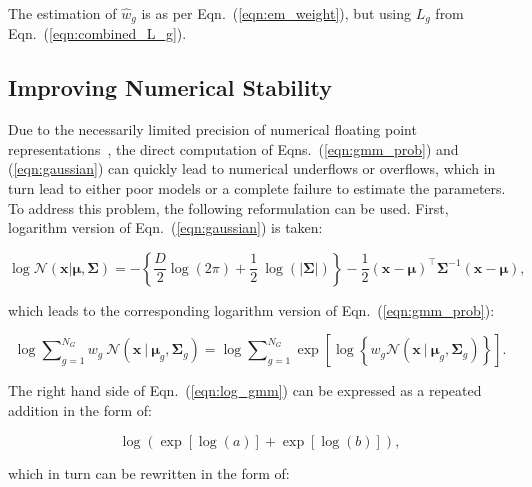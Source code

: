 \documentclass[10pt,a4paper]{article}
\def\Vec#1{{\boldsymbol{#1}}}
\def\Mat#1{{\boldsymbol{#1}}}
\begin{document}
\vspace{-2ex}
The estimation of $\widehat{w}_g$ is as per Eqn.~(\ref{eqn:em_weight}), but using $L_g$ from Eqn.~(\ref{eqn:combined_L_g}).

\subsection{Improving Numerical Stability}

Due to the necessarily limited precision of numerical floating point representations~\cite{Goldberg_1991,Monniaux_2008},
the direct computation of Eqns.~(\ref{eqn:gmm_prob}) and (\ref{eqn:gaussian}) can quickly lead to numerical underflows or overflows,
which in turn lead to either poor models or a complete failure to estimate the parameters.
To address this problem, the following reformulation can be used.
First, logarithm version of Eqn.~(\ref{eqn:gaussian}) is taken:

\vspace{-3ex}
\begin{equation}
  \log {{\mathcal{N}}}( \Vec{x} | \Vec{\mu}, \Mat{\Sigma} )
  = -\left\{\frac{D}{2} \log \left( 2\pi \right) + \frac{1}{2} ~ \log ( |\Mat{\Sigma}| ) \right\}
    -\frac{1}{2} (\Vec{x}-\Vec{\mu})^\top \Mat{\Sigma}^{-1} (\Vec{x}-\Vec{\mu}),
\end{equation}

\vspace{-1ex}
which leads to the corresponding logarithm version of Eqn.~(\ref{eqn:gmm_prob}):

\vspace{-3ex}
\begin{equation}
\log \sum\nolimits_{g=1}^{N_G} w_g ~ {{\mathcal{N}}}( \Vec{x} ~|~ \Vec{\mu}_g, \Mat{\Sigma}_g )
=
\log \sum\nolimits_{g=1}^{N_G} \exp\left[ \log \left\{ w_g {{\mathcal{N}}}( \Vec{x} ~|~ \Vec{\mu}_g, \Mat{\Sigma}_g ) \right\} \right].
\label{eqn:log_gmm}
\end{equation}

\vspace{-2ex}
The right hand side of Eqn.~(\ref{eqn:log_gmm}) can be expressed as a repeated addition in the form of:

\vspace{-3ex}
\begin{equation}
\log\left( \exp\left[\log(a)\right] + \exp\left[\log(b)\right] \right),
\end{equation}

\vspace{-1ex}
which in turn can be rewritten in the form of:
\end{document}
